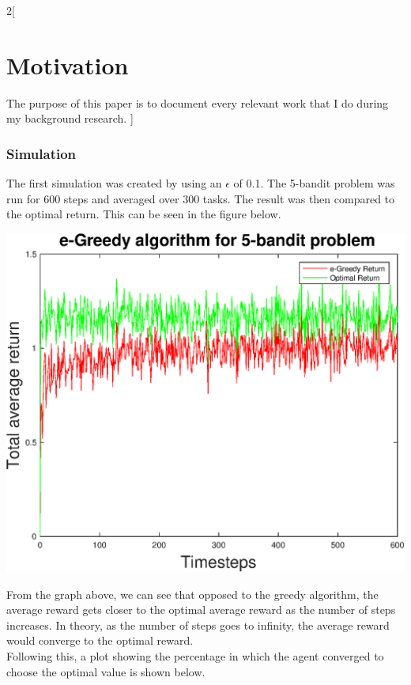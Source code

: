 \documentclass[a4paper]{article}
\newenvironment{Figure}
{\par\medskip\noindent\minipage{\linewidth}}
{\endminipage\par\medskip}
\begin{document}
\begin{multicols}{2}[
		\section*{Motivation}
		The purpose of this paper is to document every relevant work that I do during my background research.
		]
		\subsubsection{Simulation}
		The first simulation was created by using an $\epsilon$ of 0.1. The 5-bandit problem was run for 600 steps and averaged over 300 tasks. The result was then compared to the optimal return. This can be seen in the figure below.
		
		\begin{Figure}
			\centering
			\includegraphics[width=\linewidth]{egreedyplot1.eps}
		\end{Figure}
		
		From the graph above, we can see that opposed to the greedy algorithm, the average reward gets closer to the optimal average reward as the number of steps increases. In theory, as the number of steps goes to infinity, the average reward would converge to the optimal reward. \\
		
		Following this, a plot showing the percentage in which the agent converged to choose the optimal value is shown below.
		

\end{multicols}
\end{document}
